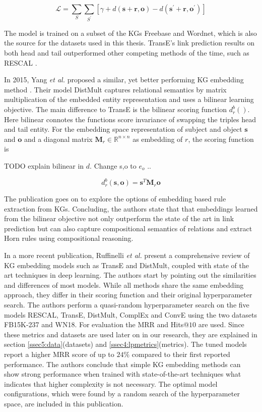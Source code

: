 \begin{equation}
    \mathcal{L}=\sum_{S} \sum_{S^{\prime}} \left[\gamma+d(\boldsymbol{s}+\boldsymbol{r}, \boldsymbol{o})-d\left(\boldsymbol{s}^{\prime}+\boldsymbol{r}, \boldsymbol{o}^{\prime}\right)\right]
\end{equation}

The model is trained on a subset of the KGs Freebase and Wordnet, which is also the source for the datasets used in this thesis. TransE's link prediction results on both head and tail outperformed other competing methods of the time, such as RESCAL \cite{nickel_three-way_nodate}.

In 2015, Yang \textit{et al.} proposed a similar, yet better performing KG embedding method \cite{yang_embedding_2015}. Their model DistMult captures relational semantics by matrix multiplication of the embedded entity representation and uses a bilinear learning objective. The main difference to TransE is the bilinear scoring function $d_{r}^{b}()$. Here bilinear connotes the functions score invariance of swapping the triples head and tail entity. For the embedding space representation of subject and object $\boldsymbol{s}$ and $\boldsymbol{o}$ and a diagonal matrix $\mathbf{M}_{r} \in \mathbb{R}^{n \times n}$ as embedding of $r$, the scoring function is

TODO explain bilinear in $d$. Change s,o to $e_o$ ..


\begin{equation}
    d_{r}^{b}\left(\boldsymbol{s}, \boldsymbol{o}\right)=\boldsymbol{s}^{T} \mathbf{M}_{r} \boldsymbol{o}
    \label{eq2:distmult}
\end{equation}

The publication goes on to explore the options of embedding based rule extraction from KGs. Concluding, the authors state that that embeddings learned from the bilinear objective not only outperform the state of the art in link prediction but can also capture compositional semantics of relations and extract Horn rules using compositional reasoning.


In a more recent publication, Ruffinelli \textit{et al.} present a comprehensive review of KG embedding models such as TransE and DistMult, coupled with state of the art techniques in deep learning. The authors start by pointing out the similarities and differences of most models. While all methods share the same embedding approach, they differ in their scoring function and their original hyperparameter search. The authors perform a quasi-random hyperparameter search on the five models RESCAL, TransE, DistMult, ComplEx and ConvE using the two datasets FB15K-237 and WN18. For evaluation the MRR and Hits@$10$ are used. Since these metrics and datasets are used later on in our research, they are explained in section \ref{ssec5:data}(datasets) and \ref{ssec4:lpmetrics}(metrics). The tuned models report a higher MRR score of up to $24\%$ compared to their first reported performance. The authors conclude that simple KG embedding methods can show strong performance when trained with state-of-the-art techniques what indicates that higher complexity is not necessary. The optimal model configurations, which were found by a random search of the hyperparameter space, are included in this publication. 

